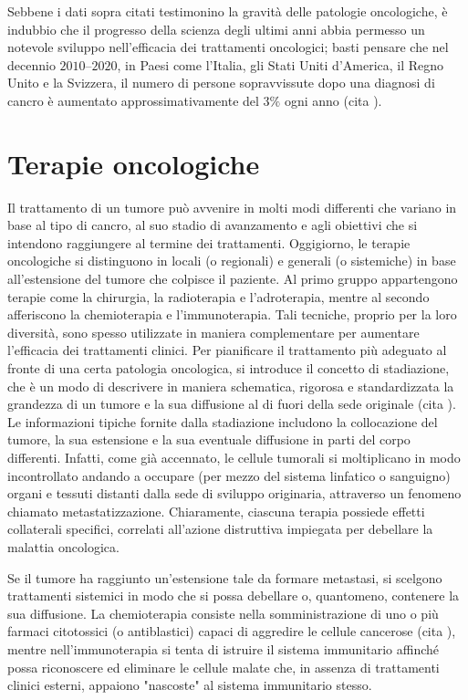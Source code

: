 \documentclass[12pt,a4paper,twoside]{report}
\begin{document}
	Sebbene i dati sopra citati testimonino la gravità delle patologie oncologiche, è indubbio che il progresso della scienza degli ultimi anni abbia permesso un notevole sviluppo nell'efficacia dei trattamenti oncologici; basti pensare che nel decennio $2010$--$2020$, in Paesi come l'Italia, gli Stati Uniti d'America, il Regno Unito e la Svizzera, il numero di persone sopravvissute dopo una diagnosi di cancro è aumentato approssimativamente del $3\%$ ogni anno (cita
	).
	
	\section{Terapie oncologiche}\label{sec:1.2}
	Il trattamento di un tumore può avvenire in molti modi differenti che variano in base al tipo di cancro, al suo stadio di avanzamento e agli obiettivi che si intendono raggiungere al termine dei trattamenti. Oggigiorno, le terapie oncologiche si distinguono in locali (o regionali) e generali (o sistemiche) in base all'estensione del tumore che colpisce il paziente. Al primo gruppo appartengono terapie come la chirurgia, la radioterapia e l'adroterapia, mentre al secondo afferiscono la chemioterapia e l'immunoterapia. Tali tecniche, proprio per la loro diversità, sono spesso utilizzate in maniera complementare per aumentare l'efficacia dei trattamenti clinici. Per pianificare il trattamento più adeguato al fronte di una certa patologia oncologica, si introduce il concetto di stadiazione, che è un modo di descrivere in maniera schematica, rigorosa e standardizzata la grandezza di un tumore e la sua diffusione al di fuori della sede originale (cita
	). Le informazioni tipiche fornite dalla stadiazione includono la collocazione del tumore, la sua estensione e la sua eventuale diffusione in parti del corpo differenti. Infatti, come già accennato, le cellule tumorali si moltiplicano in modo incontrollato andando a occupare (per mezzo del sistema linfatico o sanguigno) organi e tessuti distanti dalla sede di sviluppo originaria, attraverso un fenomeno chiamato metastatizzazione. Chiaramente, ciascuna terapia possiede effetti collaterali specifici, correlati all'azione distruttiva impiegata per debellare la malattia oncologica.
	
	Se il tumore ha raggiunto un'estensione tale da formare metastasi, si scelgono trattamenti sistemici in modo che si possa debellare o, quantomeno, contenere la sua diffusione. La chemioterapia consiste nella somministrazione di uno o più farmaci citotossici (o antiblastici) capaci di aggredire le cellule cancerose (cita
	), mentre nell'immunoterapia si tenta di istruire il sistema immunitario affinché possa riconoscere ed eliminare le cellule malate che, in assenza di trattamenti clinici esterni, appaiono "nascoste" al sistema immunitario stesso.
	
\end{document}
